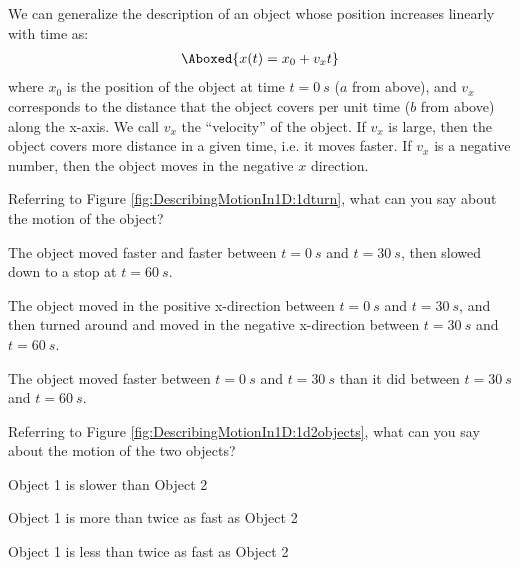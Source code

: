 We can generalize the description of an object whose position increases linearly with time as:
\begin{align}
\label{eqn:DescribingMotionIn1D:1dxvst_noa}
\Aboxed{x(t) = x_0 + v_xt}
\end{align}
where $x_0$ is the position of the object at time $t=\SI{0}{s}$ ($a$ from above), and $v_x$ corresponds to the distance that the object covers per unit time ($b$ from above) along the x-axis. We call $v_x$ the ``velocity'' of the object. If $v_x$ is large, then the object covers more distance in a given time, i.e. it moves faster. If $v_x$ is a negative number, then the object moves in the negative $x$ direction.

\begin{checkpoint}
\begin{MCquestion}{Referring to Figure \ref{fig:DescribingMotionIn1D:1dturn}, what can you say about the motion of the object? }
\item The object moved faster and faster between $t=\SI{0}{s}$ and $t=\SI{30}{s}$, then slowed down to a stop at $t=\SI{60}{s}$.
\item The object moved in the positive x-direction between $t=\SI{0}{s}$ and $t=\SI{30}{s}$, and then turned around and moved in the negative x-direction between $t=\SI{30}{s}$ and $t=\SI{60}{s}$. %
\item The object moved faster between $t=\SI{0}{s}$ and $t=\SI{30}{s}$ than it did between $t=\SI{30}{s}$ and $t=\SI{60}{s}$.
\end{MCquestion}
\end{checkpoint}

\begin{checkpoint}
\begin{MCquestion}{Referring to Figure \ref{fig:DescribingMotionIn1D:1d2objects}, what can you say about the motion of the two objects? }
\item Object 1 is slower than Object 2
\item Object 1 is more than twice as fast as Object 2 %
\item Object 1 is less than twice as fast as Object 2
\end{MCquestion}
\end{checkpoint}

